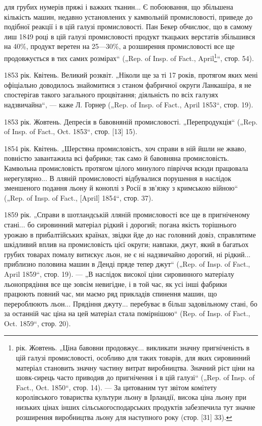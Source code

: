для грубих нумерів пряжі і важких тканин... Є побоювання, що
збільшена кількість машин, недавно установлених у камвольній
промисловості, приведе до подібної реакції і в цій галузі промисловості.
Пан Бекер обчислює, що в самому лиш 1849 році в цій
галузі промисловості продукт ткацьких верстатів збільшився на
40\%, продукт веретен на 25—30\%, а розширення промисловості
все ще продовжується в тих самих розмірах“ („Rep. of Insp.
of Fact., April\footnote{
рік. Жовтень. „Ціна бавовни продовжує... викликати
значну пригніченість в цій галузі промисловості, особливо для
таких товарів, для яких сировинний матеріал становить значну
частину витрат виробництва. Значний ріст ціни на шовк-сирець
часто приводив до пригнічення і в цій галузі“ („Rep. of Insp. of
Fact., Oct. 1850“, стор. 14). — За цитованим тут звітом комітету
королівського товариства культури льону в Ірландії, висока
ціна льону при низьких цінах інших сільськогосподарських продуктів
забезпечила тут значне розширення виробництва льону
для наступного року (стор. [31] 33).
}“, стор. 54).

1853 рік. Квітень. Великий розквіт. „Ніколи ще за ті 17 років,
протягом яких мені офіціально доводилось знайомитися з станом
фабричної округи Ланкашіра, я не спостерігав такого загального
процвітання; діяльність по всіх галузях надзвичайна“, —
каже Л. Горнер („Rep. of Insp. of Fact., April 1853“, стор. 19).

1853 рік. Жовтень. Депресія в бавовняній промисловості.
„Перепродукція“ („Rep. of Insp. of Fact., Oct. 1853“, стор. [13] 15).

1854 рік. Квітень. „Шерстяна промисловість, хоч справи в ній
йшли не жваво, повністю завантажила всі фабрики; так само
й бавовняна промисловість. Камвольна промисловість протягом
цілого минулого півріччя всюди працювала нерегулярно... В лляній
промисловості відбувалися порушення в наслідок зменшеного
подання льону й коноплі з Росії в зв’язку з кримською війною“
(„Rep. of Insp. of Fact., [April] 1854“, стор. 37).

1859 рік. „Справи в шотландській лляній промисловості все
ще в пригніченому стані... бо сировинний матеріал рідкий і дорогий;
погана якість торішнього урожаю в прибалтійських країнах,
звідки йде до нас головний довіз, справлятиме шкідливий вплив
на промисловість цієї округи; навпаки, джут, який в багатьох
грубих товарах помалу витискує льон, не є ні надзвичайно дорогий,
ні рідкий... приблизно половина машин в Денді пряде
тепер джут“ („Rep. of Insp. of Fact., April 1859“, стор. 19). —
„В наслідок високої ціни сировинного матеріалу льонопрядіння
все ще зовсім невигідне, і в той час, як усі інші фабрики працюють
повний час, ми маємо ряд прикладів спинення машин,
що перероблюють льон... Прядіння джуту... перебуває в більш
задовільному стані, бо за останній час ціна на цей матеріал
стала помірнішою“ (Rep. of Insp. of Fact., Oct. 1859“, стор. 20).
